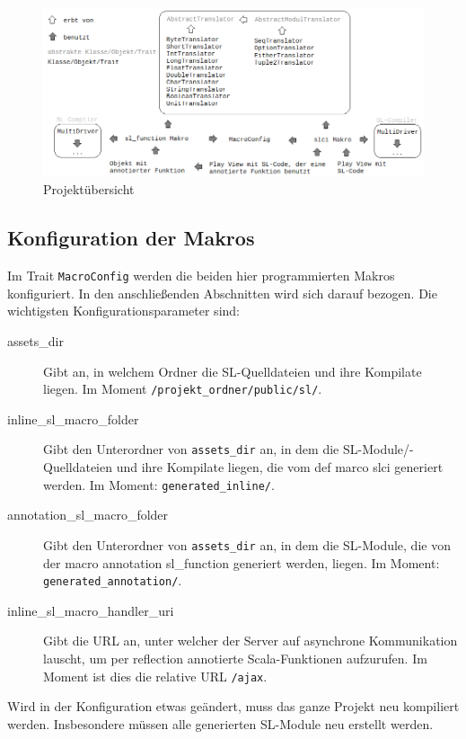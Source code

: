 \documentclass[12pt,bibtotoc]{scrreprt}
\begin{document}
\begin{figure}[h] 
  \centering
     \includegraphics[width=\textwidth]{Bilder/projektstruktur}
  \caption{Projektübersicht}
  \label{fig:project-overview}
\end{figure}

\subsection{Konfiguration der Makros}
\label{subsec:macro-config}

Im Trait \lstinline!MacroConfig! werden die beiden hier programmierten Makros konfiguriert. In den anschließenden Abschnitten wird sich darauf bezogen. Die wichtigsten Konfigurationsparameter sind:

\begin{description}
 \item[assets\_dir] Gibt an, in welchem Ordner die SL-Quelldateien und ihre Kompilate liegen. Im Moment \lstinline!/projekt_ordner/public/sl/!.
 \item[inline\_sl\_macro\_folder] Gibt den Unterordner von \lstinline!assets_dir! an, in dem die SL-Module/-Quelldateien und ihre Kompilate liegen, die vom def marco slci generiert werden. Im Moment: \lstinline!generated_inline/!.
 \item[annotation\_sl\_macro\_folder] Gibt den Unterordner von \lstinline!assets_dir! an, in dem die SL-Module, die von der macro annotation sl\_function generiert werden, liegen. Im Moment: \lstinline!generated_annotation/!.
 \item[inline\_sl\_macro\_handler\_uri] Gibt die URL an, unter welcher der Server auf asynchrone Kommunikation lauscht, um per reflection annotierte Scala-Funktionen aufzurufen. Im Moment ist dies die relative \ac{URL} \lstinline!/ajax!.
\end{description}

Wird in der Konfiguration etwas geändert, muss das ganze Projekt neu kompiliert werden. Insbesondere müssen alle generierten SL-Module neu erstellt werden.
\end{document}
